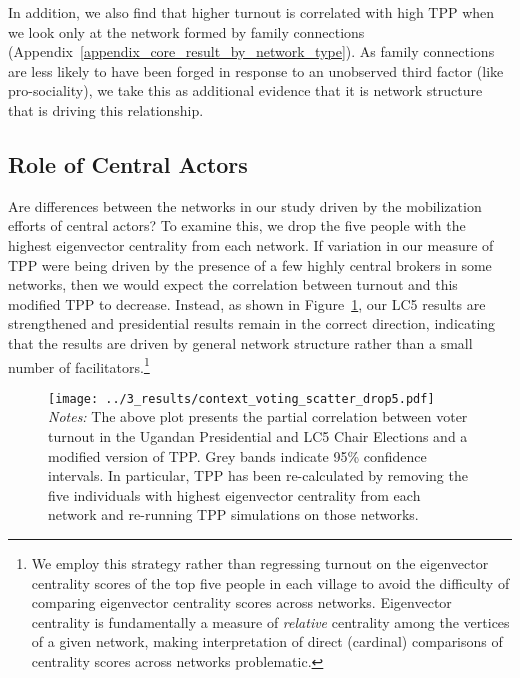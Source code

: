 \documentclass[12pt]{article}
\begin{document}

In addition, we also find that higher turnout is correlated with high TPP when we look only at the network formed by family connections (Appendix~\ref{appendix_core_result_by_network_type}). As family connections are less likely to have been forged in response to an unobserved third factor (like pro-sociality), we take this as additional evidence that it is network structure that is driving this relationship.

\subsection{Role of Central Actors}\label{section_interpretation}

Are differences between the networks in our study driven by the mobilization efforts of central actors? To examine this, we drop the five people with the highest eigenvector centrality from each network. If variation in our measure of TPP were being driven by the presence of a few highly central brokers in some networks, then we would expect the correlation between turnout and this modified TPP to decrease. Instead, as shown in Figure~\ref{figure_context_voting_scatter_drop5}, our LC5 results are strengthened and presidential results remain in the correct direction, indicating that the results are driven by general network structure rather than a small number of facilitators.\footnote{We employ this strategy rather than regressing turnout on the eigenvector centrality scores of the top five people in each village to avoid the difficulty of comparing eigenvector centrality scores across networks. Eigenvector centrality is fundamentally a measure of \emph{relative} centrality among the vertices of a given network, making interpretation of direct (cardinal) comparisons of centrality scores across networks problematic.}

\begin{figure}
	    \caption{}\label{figure_context_voting_scatter_drop5}
    		\texttt{[image: ../3\_results/context\_voting\_scatter\_drop5.pdf]}
	\scriptsize{\emph{Notes:}  The above plot presents the partial correlation between voter turnout in the Ugandan Presidential and LC5 Chair Elections and a modified version of TPP.  Grey bands indicate 95\% confidence intervals. In particular, TPP has been re-calculated by removing the five individuals with highest eigenvector centrality from each network and re-running TPP simulations on those networks.}
\end{figure}
\end{document}
